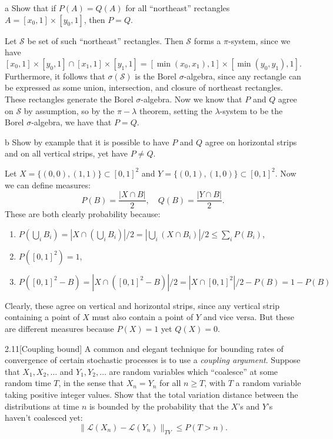 \documentclass{pset}
\begin{document}
\begin{parts}
    \begin{part}{a}
        Show that if $P(A) = Q(A)$ for all ``northeast'' rectangles $A=[x_0, 1]\times [y_0,1]$, then $P = Q$.
    \end{part}

    Let $\mathcal{S}$ be set of such ``northeast'' rectangles. Then $\mathcal{S}$ forms a $\pi$-system, since we have
    \[
        [x_0,1]\times [y_0, 1] \cap [x_1,1]\times [y_1, 1] = [\min(x_0,x_1), 1]\times [\min(y_0, y_1), 1]
    .\] 
    Furthermore, it follows that $\sigma(\mathcal{S})$ is the Borel $\sigma$-algebra, since any rectangle can be expressed as some union, intersection, and closure of northeast rectangles. These rectangles generate the Borel $\sigma$-algebra. Now we know that $P$ and $Q$ agree on $\mathcal{S}$ by assumption, so by the $\pi-\lambda$ theorem, setting the $\lambda$-system to be the Borel $\sigma$-algebra, we have that $P=Q$. 

    \begin{part}{b}
        Show by example that it is possible to have $P$ and $Q$ agree on horizontal strips and on all vertical strips, yet have $P\neq Q$.
    \end{part}

    Let $X=\{(0,0), (1,1)\}\subset [0,1]^2$ and $Y=\{(0,1), (1,0)\}\subset [0,1]^2$. Now we can define measures:
    \[
        P(B) = \frac{|X\cap B|}{2},\quad Q(B) = \frac{|Y\cap B|}{2}
    .\] 
    These are both clearly probability because:
    \begin{enumerate}
        \item $P\left(\bigcup_i B_i\right) = |X\cap \left(\bigcup_i B_i\right)|/2 = \left|\bigcup_i (X\cap B_i)\right|/2 \leq \sum_i P(B_i)$,
        \item $P([0,1]^2) = 1$,
        \item $P([0,1]^2 - B) = |X\cap ([0,1]^2 - B)|/2 = |X\cap [0,1]^2|/2 - P(B)=  1-P(B)$
    \end{enumerate}
    Clearly, these agree on vertical and horizontal strips, since any vertical strip containing a point of $X$ must also contain a point of $Y$ and vice versa. But these are different measures because $P(X)=1$ yet $Q(X)=0$.
\end{parts}

\begin{problem}{2.11}[Coupling bound]
    A common and elegant technique for bounding rates of convergence of certain stochastic processes is to use a \emph{coupling argument}. Suppose that $X_1, X_2,\ldots$ and $Y_1,Y_2,\ldots$ are random variables which ``coalesce'' at some random time $T$, in the sense that $X_n=Y_n$ for all $n\geq T$, with $T$ a random variable taking positive integer values. Show that the total variation distance between the distributions at time $n$ is bounded by the probability that the $X$'s and $Y$'s haven't coalesced yet:
    \[
        \|\mathcal{L}(X_n)-\mathcal{L}(Y_n)\|_{TV} \leq P(T > n)
    .\] 
\end{problem}
\end{document}
